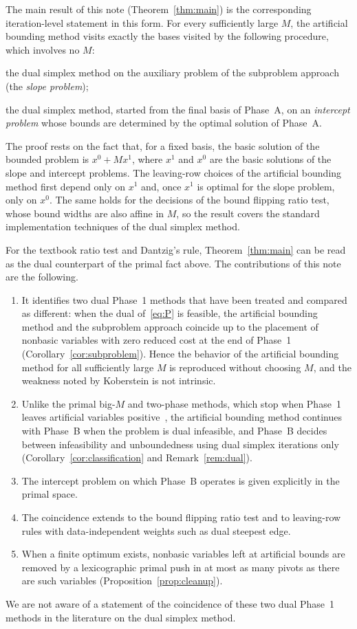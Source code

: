 \documentclass[11pt,a4paper]{article}
\theoremstyle{plain}
\theoremstyle{definition}
\theoremstyle{remark}
\begin{document}
The main result of this note (Theorem~\ref{thm:main}) is the corresponding iteration-level statement in this form. For every sufficiently large $M$, the artificial bounding method visits exactly the bases visited by the following procedure, which involves no $M$:
\begin{description}[leftmargin=1em]
\item[Phase A:] the dual simplex method on the auxiliary problem of the subproblem approach (the \emph{slope problem});
\item[Phase B:] the dual simplex method, started from the final basis of Phase~A, on an \emph{intercept problem} whose bounds are determined by the optimal solution of Phase~A.
\end{description}
The proof rests on the fact that, for a fixed basis, the basic solution of the bounded problem is $x^0+Mx^1$, where $x^1$ and $x^0$ are the basic solutions of the slope and intercept problems. The leaving-row choices of the artificial bounding method first depend only on $x^1$ and, once $x^1$ is optimal for the slope problem, only on $x^0$. The same holds for the decisions of the bound flipping ratio test, whose bound widths are also affine in $M$, so the result covers the standard implementation techniques of the dual simplex method.

For the textbook ratio test and Dantzig's rule, Theorem~\ref{thm:main} can be read as the dual counterpart of the primal fact above. The contributions of this note are the following.
\begin{enumerate}[label=(\roman*)]
\item It identifies two dual Phase~1 methods that have been treated and compared as different: when the dual of~\eqref{eq:P} is feasible, the artificial bounding method and the subproblem approach coincide up to the placement of nonbasic variables with zero reduced cost at the end of Phase~1 (Corollary~\ref{cor:subproblem}). Hence the behavior of the artificial bounding method for all sufficiently large $M$ is reproduced without choosing $M$, and the weakness noted by Koberstein is not intrinsic.
\item Unlike the primal big-$M$ and two-phase methods, which stop when Phase~1 leaves artificial variables positive~\cite[Sect.~4.3]{bazaraa2010}, the artificial bounding method continues with Phase~B when the problem is dual infeasible, and Phase~B decides between infeasibility and unboundedness using dual simplex iterations only (Corollary~\ref{cor:classification} and Remark~\ref{rem:dual}).
\item The intercept problem on which Phase~B operates is given explicitly in the primal space.
\item The coincidence extends to the bound flipping ratio test and to leaving-row rules with data-independent weights such as dual steepest edge.
\item When a finite optimum exists, nonbasic variables left at artificial bounds are removed by a lexicographic primal push in at most as many pivots as there are such variables (Proposition~\ref{prop:cleanup}).
\end{enumerate}
We are not aware of a statement of the coincidence of these two dual Phase~1 methods in the literature on the dual simplex method.
\end{document}
